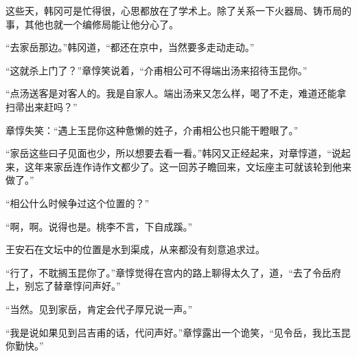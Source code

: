 这些天，韩冈可是忙得很，心思都放在了学术上。除了关系一下火器局、铸币局的事，其他也就一个编修局能让他分心了。

“去家岳那边。”韩冈道，“都还在京中，当然要多走动走动。”

“这就杀上门了？”章惇笑说着，“介甫相公可不得端出汤来招待玉昆你。”

“点汤送客是对客人的。我是自家人。端出汤来又怎么样，喝了不走，难道还能拿扫帚出来赶吗？”

章惇失笑：“遇上玉昆你这种惫懒的姓子，介甫相公也只能干瞪眼了。”

“家岳这些曰子见面也少，所以想要去看一看。”韩冈又正经起来，对章惇道，“说起来，这年来家岳连作诗作文都少了。这一回苏子瞻回来，文坛座主可就该轮到他来做了。”

“相公什么时候争过这个位置的？”

“啊，啊。说得也是。桃李不言，下自成蹊。”

王安石在文坛中的位置是水到渠成，从来都没有刻意追求过。

“行了，不耽搁玉昆你了。”章惇觉得在宫内的路上聊得太久了，道，“去了令岳府上，别忘了替章惇问声好。”

“当然。见到家岳，肯定会代子厚兄说一声。”

“我是说如果见到吕吉甫的话，代问声好。”章惇露出一个诡笑，“见令岳，我比玉昆你勤快。”

